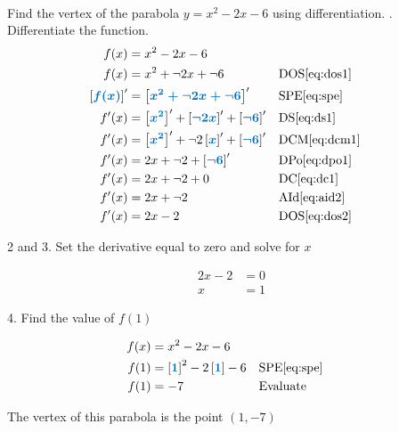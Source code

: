 \documentclass[20150903-160354-rs2.2-MarksMathNotebook.tex]{subfiles}
\begin{document}
\begin{example}[id:20150923-152515] \label{20150923-152515} \hfill \\
Find the vertex of the parabola $y=x^2-2x-6$ using differentiation.
\soln
{}. Differentiate the function.
\begin{align*}
f(x) &=x^2-2x-6 \\
f(x) &=x^2+ \neg 2x + \neg 6 && \text{DOS} \eqref{eq:dos1} \\
\farg{f(x)}' &= \farg{x^2+ \neg 2x + \neg 6}' && \text{SPE} \eqref{eq:spe} \\
f'(x) &= \farg{x^2}'+ \farg{\neg 2x}' + \farg{\neg 6}' && \text{DS} \eqref{eq:ds1} \\
f'(x) &= \farg{x^2}'+ \neg 2 \farg{x}' + \farg{\neg 6}' && \text{DCM} \eqref{eq:dcm1} \\
f'(x) &= 2x + \neg 2 + \farg{\neg 6}' && \text{DPo} \eqref{eq:dpo1} \\
f'(x) &= 2x + \neg 2 + 0 && \text{DC} \eqref{eq:dc1} \\
f'(x) &= 2x + \neg 2 && \text{AId} \eqref{eq:aid2} \\
f'(x) &= 2x - 2 && \text{DOS} \eqref{eq:dos2}
\end{align*}

2 and 3. Set the derivative equal to zero and solve for $x$

\begin{align*}
2x-2 & = 0\\
x &= 1
\end{align*}

4. Find the value of $f(1)$

\begin{align*}
f(x) & = x^2-2x-6 \\
f(1) &= \farg{1}^2-2\farg{1}-6 && \text{SPE} \eqref{eq:spe} \\
f(1) &= -7  &&\text{Evaluate}
\end{align*}

The vertex of this parabola is the point $(1,-7)$
\end{example}
\end{document}
